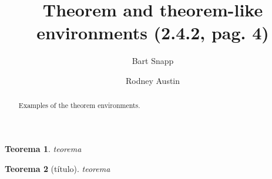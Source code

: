 \documentclass{ximera}
\author{Bart Snapp \and Rodney Austin}
\title[Examples:]{Theorem and theorem-like environments (2.4.2, pag. 4)}
\newtheorem{teorema}{Teorema}
\begin{document}
\begin{abstract}
  Examples of the theorem environments.
\end{abstract}
\maketitle




\begin{teorema}
teorema \lipsum[1]
\end{teorema}

\begin{teorema}[título]
teorema \lipsum[1]
\end{teorema}
\end{document}
